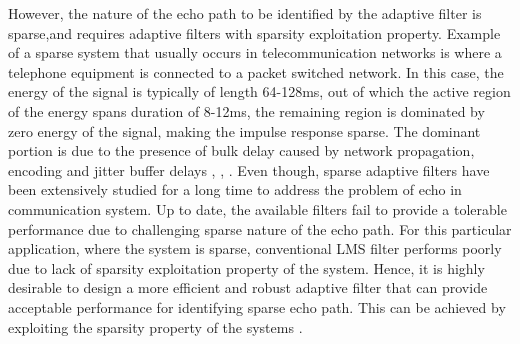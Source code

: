 \vspace{-0.5cm}
\par
\noindent However, the nature of the echo path to be identified by the adaptive filter is sparse,and requires adaptive filters with sparsity exploitation property. Example of a sparse system that usually occurs in telecommunication networks is where a telephone equipment is connected to a packet switched network. In this case, the energy of the signal is typically of length 64-128ms, out of which the active region of the energy spans duration of 8-12ms, the remaining region is dominated by zero energy of the signal, making the impulse response sparse. The dominant portion is due to the presence of bulk delay caused by network propagation, encoding and jitter buffer delays \cite{Duttweiler}, \cite{Romesburg}, \cite{Benesty2}. Even though, sparse adaptive filters have been extensively studied for a long time to address the problem of echo in communication system. Up to date, the available filters fail to provide a tolerable performance due to challenging sparse nature of the echo path. For this particular application, where the system is sparse, conventional LMS filter performs poorly due to lack of sparsity exploitation property of the system. Hence, it is highly desirable to design a more efficient and robust adaptive filter that can provide acceptable performance for identifying sparse echo path. This can be achieved by exploiting the sparsity property of the systems \cite{Brookes}.

\vspace{-0.3cm}
